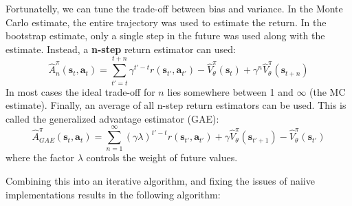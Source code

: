 Fortunatelly, we can tune the trade-off between bias and variance.
In the Monte Carlo estimate, the entire trajectory was used
to estimate the return. In the bootstrap estimate,
only a single step in the future was used along with the estimate.
Instead, a \textbf{n-step} return estimator can used:
\begin{equation}
		\hat{A}^\pi_n (\bm{s}_{t}, \bm{a}_{t}) =
		\sum_{t'=t}^{t+n} \gamma^{t'-t} r(\bm{s}_{t'}, \bm{a}_{t'})
		- \hat{V}^\pi_\theta(\bm{s}_t) + \gamma^n \hat{V}^\pi_\theta(\bm{s}_{t+n})
\end{equation}
In most cases
the ideal trade-off for $ n  $ lies somewhere between 1 and $\infty$ (the MC estimate).
Finally, an average of all n-step return estimators can be used.
This is called the generalized advantage estimator (GAE):
\begin{equation}
\hat{A}^\pi_{GAE} (\bm{s}_{t}, \bm{a}_{t}) =
\sum_{n=1}^{\infty} (\gamma \lambda)^{t'-t}r(\bm{s}_{t'}, \bm{a}_{t'}) + \gamma \hat{V}^\pi_\theta(\bm{s}_{t'+1})  - \hat{V}^\pi_\theta(\bm{s}_{t'})
\end{equation}
where the factor $ \lambda  $ controls the weight of future values.

Combining this into an iterative algorithm, and fixing the issues
of naiive implementations results in the following algorithm:


 
